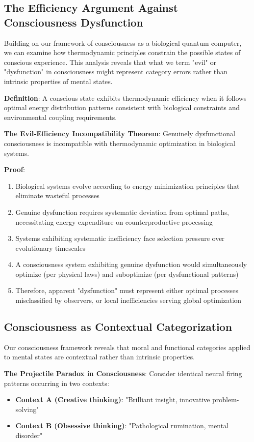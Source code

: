 \documentclass[12pt]{article}
\begin{document}
\subsection{The Efficiency Argument Against Consciousness Dysfunction}

Building on our framework of consciousness as a biological quantum computer, we can examine how thermodynamic principles constrain the possible states of conscious experience. This analysis reveals that what we term "evil" or "dysfunction" in consciousness might represent category errors rather than intrinsic properties of mental states.

\textbf{Definition}: A conscious state exhibits thermodynamic efficiency when it follows optimal energy distribution patterns consistent with biological constraints and environmental coupling requirements.

\textbf{The Evil-Efficiency Incompatibility Theorem}: Genuinely dysfunctional consciousness is incompatible with thermodynamic optimization in biological systems.

\textbf{Proof}:
\begin{enumerate}
\item Biological systems evolve according to energy minimization principles that eliminate wasteful processes
\item Genuine dysfunction requires systematic deviation from optimal paths, necessitating energy expenditure on counterproductive processing
\item Systems exhibiting systematic inefficiency face selection pressure over evolutionary timescales
\item A consciousness system exhibiting genuine dysfunction would simultaneously optimize (per physical laws) and suboptimize (per dysfunctional patterns)
\item Therefore, apparent "dysfunction" must represent either optimal processes misclassified by observers, or local inefficiencies serving global optimization
\end{enumerate}

\subsection{Consciousness as Contextual Categorization}

Our consciousness framework reveals that moral and functional categories applied to mental states are contextual rather than intrinsic properties.

\textbf{The Projectile Paradox in Consciousness}: Consider identical neural firing patterns occurring in two contexts:
\begin{itemize}
\item \textbf{Context A (Creative thinking)}: "Brilliant insight, innovative problem-solving"
\item \textbf{Context B (Obsessive thinking)}: "Pathological rumination, mental disorder"
\end{itemize}
\end{document}
